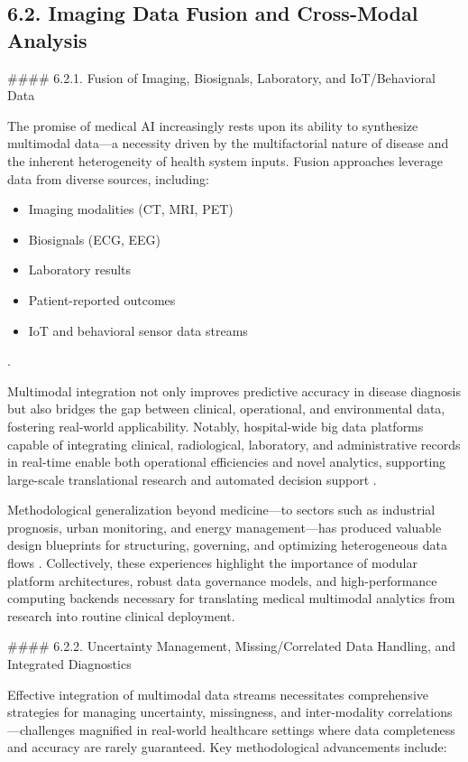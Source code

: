 \documentclass[11pt]{article}
\begin{document}
\subsection{6.2. Imaging Data Fusion and Cross-Modal Analysis}

#### 6.2.1. Fusion of Imaging, Biosignals, Laboratory, and IoT/Behavioral Data

The promise of medical AI increasingly rests upon its ability to synthesize multimodal data—a necessity driven by the multifactorial nature of disease and the inherent heterogeneity of health system inputs. Fusion approaches leverage data from diverse sources, including:
\begin{itemize}
    \item Imaging modalities (CT, MRI, PET)
    \item Biosignals (ECG, EEG)
    \item Laboratory results
    \item Patient-reported outcomes
    \item IoT and behavioral sensor data streams
\end{itemize}
\cite{ref46,ref53,ref67,ref71}. 

Multimodal integration not only improves predictive accuracy in disease diagnosis but also bridges the gap between clinical, operational, and environmental data, fostering real-world applicability. Notably, hospital-wide big data platforms capable of integrating clinical, radiological, laboratory, and administrative records in real-time enable both operational efficiencies and novel analytics, supporting large-scale translational research and automated decision support \cite{ref106}.

Methodological generalization beyond medicine—to sectors such as industrial prognosis, urban monitoring, and energy management—has produced valuable design blueprints for structuring, governing, and optimizing heterogeneous data flows \cite{ref66,ref67,ref68,ref70,ref71,ref72,ref75,ref84}. Collectively, these experiences highlight the importance of modular platform architectures, robust data governance models, and high-performance computing backends necessary for translating medical multimodal analytics from research into routine clinical deployment.

#### 6.2.2. Uncertainty Management, Missing/Correlated Data Handling, and Integrated Diagnostics

Effective integration of multimodal data streams necessitates comprehensive strategies for managing uncertainty, missingness, and inter-modality correlations—challenges magnified in real-world healthcare settings where data completeness and accuracy are rarely guaranteed. Key methodological advancements include:
\end{document}
